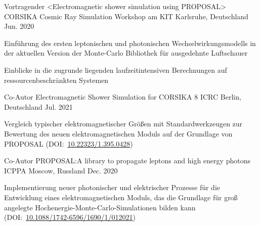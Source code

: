 \documentclass[11pt, a4paper]{Awesome-CV/awesome-cv}
\begin{document}
\begin{cventries}
    \cventry
    {Vortragender <Electromagnetic shower simulation using PROPOSAL>} %
    {CORSIKA Cosmic Ray Simulation Workshop am KIT} %
    {Karlsruhe, Deutschland} %
    {Jun. 2020} %
    {
        \begin{cvitems} %
        \item {Einführung des ersten leptonischen und photonischen
            Wechselwirkungsmodells in der aktuellen Version der
        Monte-Carlo Bibliothek für ausgedehnte Luftschauer}
        \item {Einblicke in die zugrunde liegenden laufzeitintensiven Berechnungen auf ressourcenbeschränkten Systemen}
        \end{cvitems}
    }

    \cventry
    {Co-Autor} %
    {Electromagnetic Shower Simulation for CORSIKA 8} %
    {ICRC Berlin, Deutschland} %
    {Jul. 2021} %
    {
        \begin{cvitems} %
        \item {Vergleich typischer elektromagnetischer Größen mit
                Standardwerkzeugen zur Bewertung des neuen elektromagnetischen
                Moduls auf der Grundlage von PROPOSAL
                (DOI:~\href{https://doi.org/10.22323/1.395.0428}{10.22323/1.395.0428})
            }
        \end{cvitems}
    }

    \cventry
    {Co-Autor} %
    {PROPOSAL:\@ A library to propagate leptons and high energy photons} %
    {ICPPA Moscow, Russland} %
    {Dec. 2020} %
    {
        \begin{cvitems} %
        \item {Implementierung neuer photonischer und elektrischer Prozesse für
            die Entwicklung eines elektromagnetischen Moduls, das die Grundlage
        für groß angelegte Hochenergie-Monte-Carlo-Simulationen bilden kann (DOI:~\href{https://doi.org/10.1088/1742-6596/1690/1/012021}{10.1088/1742-6596/1690/1/012021})}
        \end{cvitems}
    }
\end{cventries}
\end{document}
